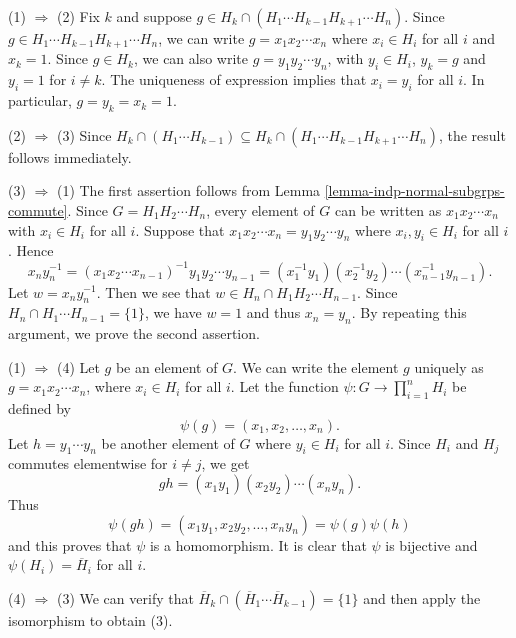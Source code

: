 \begin{sketch}
	(1) $\Rightarrow$ (2)  Fix $k$ and suppose $g \in H_k \cap (H_1\cdots H_{k-1}H_{k+1}\cdots H_n)$. Since $g \in H_1\cdots H_{k-1}H_{k+1}\cdots H_n $, we can write $g = x_1 x_2 \cdots x_n$ where $x_i \in H_i$ for all $i$ and $x_k = 1$. Since $g \in H_k$,  we can also write $g = y_1 y_2 \cdots y_n$, with $y_i \in H_i$, $y_k = g$ and $y_i = 1$ for $i \ne k$. The uniqueness of expression implies that $x_i = y_i$ for all $i$. In particular, $g = y_k = x_k = 1$.
	
	(2) $\Rightarrow$ (3) Since $H_k \cap (H_1\cdots H_{k-1}) \subseteq H_k \cap (H_1\cdots H_{k-1}H_{k+1}\cdots H_n )$, the result follows immediately.
	
	(3) $\Rightarrow$ (1) The first assertion follows from Lemma \ref{lemma-indp-normal-subgrps-commute}. Since $G = H_1 H_2 \cdots H_n$, every element of $G$ can be written as $x_1 x_2 \cdots x_n$ with $x_i \in H_i$ for all $i$. Suppose that $x_1 x_2 \cdots x_n = y_1 y_2 \cdots y_n$ where $x_i,y_i\in H_i$ for all $i$. Hence
	\begin{equation*}
		x_n y_n^{-1} = (x_1 x_2 \cdots x_{n-1})^{-1}y_1 y_2 \cdots y_{n-1} = (x_1^{-1}y_1)(x_2^{-1}y_2)\cdots (x_{n-1}^{-1}y_{n-1}).
	\end{equation*} Let $w = x_n y_n^{-1}$. Then we see that $w\in H_{n}\cap H_1H_2\cdots H_{n-1}$. Since $H_n \cap   H_1 \cdots H_{n-1}= \{1\}$,  we have $w = 1$ and thus $x_n = y_n$. By repeating this argument, we prove the second assertion. 
	
	(1) $\Rightarrow$ (4)  Let $g$ be an element of $G$. We can write the element $g$ uniquely as $g = x_1 x_2 \cdots x_n$, where $x_i \in H_i$ for all $i$. Let the function $\psi: G \rightarrow \prod_{i=1}^n H_i$ be defined by
	\begin{equation*}
		\psi(g) = (x_1, x_2, \dots, x_n).
	\end{equation*}
	Let $h = y_1 \cdots y_n$ be another element of $G$ where $y_i\in H_i$ for all $i$. Since $H_i$ and $H_j$ commutes elementwise for $i\neq j$, we get
	\begin{equation*}
		gh = (x_1 y_1)(x_2 y_2) \cdots (x_n y_n).
	\end{equation*}
	Thus
	\begin{equation*}
		\psi(gh) = (x_1 y_1, x_2 y_2, \ldots, x_n y_n) = \psi(g)\psi(h)
	\end{equation*}
	and this proves that $\psi$ is a homomorphism. It is clear that $\psi$ is bijective and $\psi(H_i) = \overline{H}_i$ for all $i$.
	
	(4) $\Rightarrow$ (3) We can verify that $\overline{H}_k \cap (\overline{H}_1 \cdots \overline{H}_{k-1}) = \{1\}$ and then apply the isomorphism to obtain (3).
\end{sketch}

